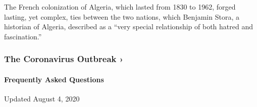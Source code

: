 The French colonization of Algeria, which lasted from 1830 to 1962,
forged lasting, yet complex, ties between the two nations, which
Benjamin Stora, a historian of Algeria, described as a ``very special
relationship of both hatred and fascination.''

\href{https://www.nytimes3xbfgragh.onion/news-event/coronavirus?action=click\&pgtype=Article\&state=default\&region=MAIN_CONTENT_3\&context=storylines_faq}{}

\hypertarget{the-coronavirus-outbreak-}{%
\subsubsection{The Coronavirus Outbreak
›}\label{the-coronavirus-outbreak-}}

\hypertarget{frequently-asked-questions}{%
\paragraph{Frequently Asked
Questions}\label{frequently-asked-questions}}

Updated August 4, 2020


